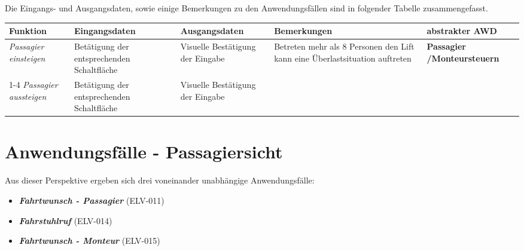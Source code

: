 Die Eingangs- und Ausgangsdaten, sowie einige Bemerkungen zu den Anwendungsfällen sind in folgender Tabelle zusammengefasst.

 {
\vspace{1cm}
\hspace{-0,5cm}
\footnotesize
\begin{tabular}{|p{}|p{}|p{}|p{}|p{2cm}|}
	\hline
		\textbf{Funktion} &
		\textbf{Eingangsdaten} &
		\textbf{Ausgangsdaten} &
		\textbf{Bemerkungen} &
		\textbf{abstrakter AWD} \\
	\hline \hline
		\textit{Passagier \newline einsteigen} &
		Betätigung der entsprechenden Schaltfläche &
		Visuelle Bestätigung der Eingabe &
		Betreten mehr als 8 Personen den Lift kann eine Überlastsituation auftreten&
		\textbf{Passagier /\newline Monteur\newline steuern} \\
	\cline{1-4}
		\textit{Passagier \newline aussteigen} &
		Betätigung der entsprechenden Schaltfläche &
		Visuelle Bestätigung der Eingabe &
		&
		\\
	\hline
\end{tabular}
}

\section{Anwendungsfälle - Passagiersicht}
Aus dieser Perspektive ergeben sich drei voneinander unabhängige Anwendungsfälle:

\begin{itemize}
	\item \textit{\textbf{Fahrtwunsch - Passagier}} (ELV-011)
	\item \textit{\textbf{Fahrstuhlruf }} (ELV-014)
	\item \textit{\textbf{Fahrtwunsch - Monteur }} (ELV-015)
\end{itemize}


